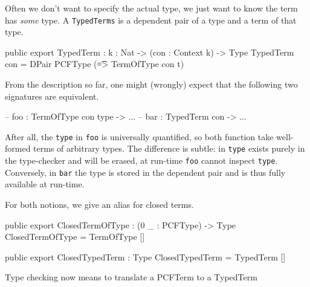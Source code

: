 Often we don't want to specify the actual type, we just want to know the term has \emph{some} type.
A \texttt{TypedTerms} is a dependent pair of a type and a term of that type.
\begin{code}
public export
TypedTerm : {k : Nat} -> (con : Context k) -> Type
TypedTerm con = DPair PCFType (\t => TermOfType con t)
\end{code}

From the description so far, one might (wrongly) expect that the following two signatures are equivalent.
\begin{code}
-- foo : TermOfType con type -> ...
-- bar : TypedTerm con    -> ...
\end{code}
After all, the \texttt{type} in \texttt{foo} is universally quantified, so both function take well-formed terms of arbitrary types.
The difference is subtle: in \texttt{type} exists purely in the type-checker and will be erased, at run-time \texttt{foo} cannot inspect \texttt{type}. Conversely, in \texttt{bar} the type is stored in the dependent pair and is thus fully available at run-time.


For both notions, we give an alias for closed terms.

\begin{code}
public export
ClosedTermOfType : (0 _ : PCFType) -> Type
ClosedTermOfType = TermOfType []

public export
ClosedTypedTerm : Type
ClosedTypedTerm = TypedTerm []
\end{code}

Type checking now means to translate a PCFTerm to a TypedTerm

